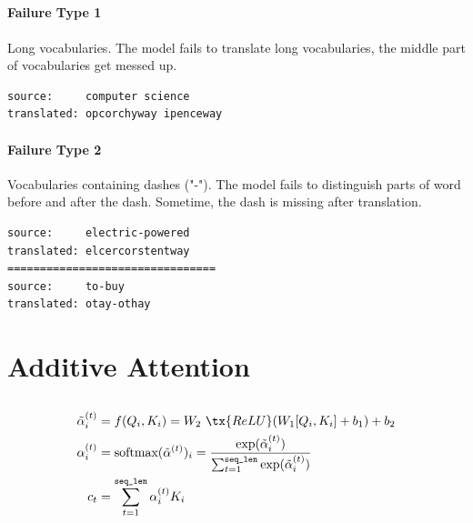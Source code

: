 \documentclass{article}
\begin{document}
	\subsection{}
\paragraph{Failure Type 1} Long vocabularies. The model fails to translate long vocabularies, the middle part of vocabularies get messed up.
\begin{lstlisting}
source:		computer science 
translated:	opcorchyway ipenceway
\end{lstlisting}
\paragraph{Failure Type 2} Vocabularies containing dashes ("-"). The model fails to distinguish parts of word before and after the dash. Sometime, the dash is missing after translation.
\begin{lstlisting}
source:		electric-powered 
translated:	elcercorstentway
================================
source:		to-buy 
translated:	otay-othay
\end{lstlisting}
	
	\section{Additive Attention}
	\subsection{}
	\begin{align}
		\tilde{\alpha}_i^{(t)} &= f(Q_i, K_i) = W_2\ \tx{ReLU}(W_1 [Q_i, K_i] + b_1) + b_2\\
		\alpha_i^{(t)} &= \text{softmax}(\tilde{\alpha}^{(t)})_i = \frac{\exp(\tilde{\alpha}_i^{(t)})}{\sum_{t=1}^\texttt{seq\_len} \exp(\tilde{\alpha}_i^{(t)})} \\
		c_t &= \sum_{t=1}^\texttt{seq\_len} \alpha_i^{(t)} K_i
	\end{align}
\end{document}
